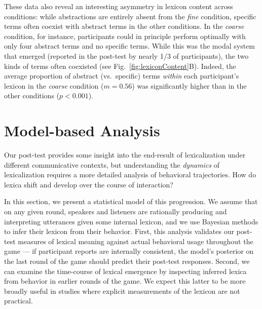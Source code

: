 \documentclass[10pt,letterpaper]{article}
\newcommand{\ndg}[1]{\textcolor{Green}{[ndg: #1]}}
\begin{document}
These data also reveal an interesting asymmetry in lexicon content across conditions: while abstractions are entirely absent from the \emph{fine} condition, specific terms often coexist with abstract terms in the other conditions. In the \emph{coarse} condition, for instance, participants could in principle perform optimally with only four abstract terms and no specific terms. While this was the modal system that emerged (reported in the post-test by nearly 1/3 of participants), the two kinds of terms often coexisted (see Fig.\ \ref{fig:lexiconContent}B). Indeed, the average proportion of abstract (vs.\ specific) terms \emph{within} each participant's lexicon in the \emph{coarse} condition ($m = 0.56$) was significantly higher than in the other conditions ($p < 0.001$).

\section{Model-based Analysis}

Our post-test provides some insight into the end-result of lexicalization under different communicative contexts, but understanding the \emph{dynamics} of lexicalization requires a more detailed analysis of behavioral trajectories. How do lexica shift and develop over the course of interaction? 

In this section, we present a statistical model of this progression. We assume that on any given round, speakers and listeners are rationally producing and interpreting utterances given some internal lexicon, and we use Bayesian methods to infer their lexicon from their behavior. First, this analysis validates our post-test measures of lexical meaning against actual behavioral usage throughout the game --- if participant reports are internally consistent, the model's posterior on the last round of the game should predict their post-test responses. Second, we can examine the time-course of lexical emergence by inspecting inferred lexica from behavior in earlier rounds of the game. We expect this latter to be more broadly useful in studies where explicit measurements of the lexicon are not practical. %
\end{document}
